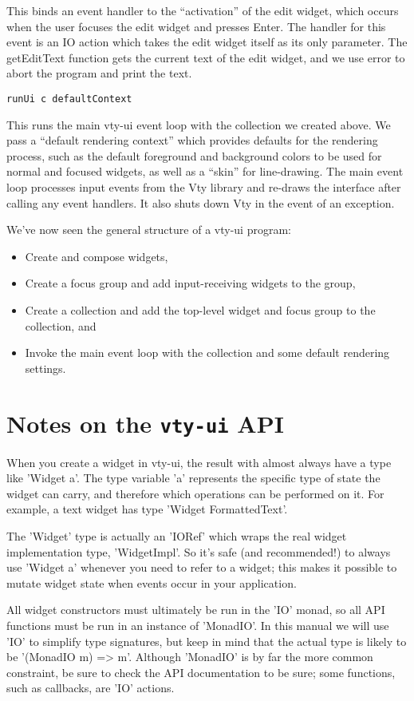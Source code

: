 This binds an event handler to the “activation” of the edit widget,
which occurs when the user focuses the edit widget and presses Enter.
The handler for this event is an IO action which takes the edit widget
itself as its only parameter.  The getEditText function gets the current
text of the edit widget, and we use error to abort the program and print
the text.

\begin{verbatim}
runUi c defaultContext
\end{verbatim}

This runs the main vty-ui event loop with the collection we created
above.  We pass a “default rendering context” which provides defaults
for the rendering process, such as the default foreground and background
colors to be used for normal and focused widgets, as well as a “skin”
for line-drawing.  The main event loop processes input events from the
Vty library and re-draws the interface after calling any event handlers.
It also shuts down Vty in the event of an exception.

We've now seen the general structure of a vty-ui program:
\begin{itemize}
\item Create and compose widgets,
\item Create a focus group and add input-receiving widgets to the group,
\item Create a collection and add the top-level widget and focus group
      to the collection, and
\item Invoke the main event loop with the collection and some default
      rendering settings.
\end{itemize}

\section{Notes on the \texttt{vty-ui} API}

When you create a widget in vty-ui, the result with almost always have a
type like 'Widget a'.  The type variable 'a' represents the specific
type of state the widget can carry, and therefore which operations can
be performed on it.  For example, a text widget has type 'Widget
FormattedText'.

The 'Widget' type is actually an 'IORef' which wraps the real widget
implementation type, 'WidgetImpl'.  So it's safe (and recommended!) to
always use 'Widget a' whenever you need to refer to a widget; this
makes it possible to mutate widget state when events occur in your
application.

All widget constructors must ultimately be run in the 'IO' monad, so
all API functions must be run in an instance of 'MonadIO'.  In this
manual we will use 'IO' to simplify type signatures, but keep in mind
that the actual type is likely to be '(MonadIO m) => m'.  Although
'MonadIO' is by far the more common constraint, be sure to check the
API documentation to be sure; some functions, such as callbacks, are
'IO' actions.
